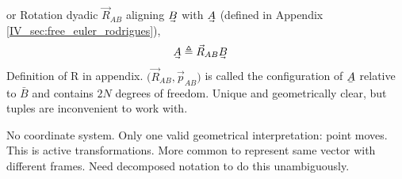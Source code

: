 
%
%
%
% 

or 
Rotation dyadic $\vec{R}_{AB}$ aligning $\uvec{B}$ with $\uvec{A}$ (defined in Appendix \ref{IV_sec:free_euler_rodrigues}),
%
\begin{align}
\uvec{A} &\triangleq \vec{R}_{AB}\uvec{B}
\end{align}
%
Definition of R in appendix. $\big(\vec{R}_{AB},\vec{p}_{AB}\big)$ is called the configuration of $\ubar{A}$ relative to $\bar{B}$ and contains $2N$ degrees of freedom. Unique and geometrically clear, but tuples are inconvenient to work with.

No coordinate system. Only one valid geometrical interpretation: point moves. This is active transformations. More common to represent same vector with different frames. Need decomposed notation to do this unambiguously.

